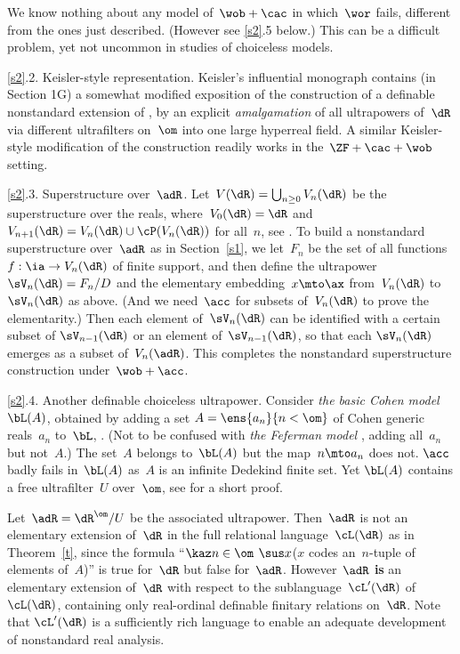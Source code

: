 \documentclass[11pt,
]{article}
\begin{document}
We know nothing about any model of~$\wob+\cac$ in 
which~$\wor$ fails, 
different from the ones just described. 
(However see \ref{s2}.5 below.) 
This can be a difficult problem, yet not uncommon in 
studies of choiceless models.\vom

{\ubf\ref{s2}.2. 
Keisler-style representation.} 
Keisler's influential monograph \cite{Ke76} contains 
(in Section 1G) a somewhat modified exposition of 
the construction of a definable
nonstandard extension of \cite{KS}, by an explicit 
{\it amalgamation\/} of all ultrapowers of~$\dR$ 
via different ultrafilters on~$\om$ into one large 
hyperreal field.  
A similar Keisler-style modification of the construction 
readily works in the~$\ZF+\cac+\wob$ setting.
\vom

{\ubf\ref{s2}.3. 
Superstructure over~$\adR$.}
%
Let~$V(\dR)=\bigcup_{n\geq0}V_n(\dR)$ be the superstructure over the
reals, where~$V_0(\dR)=\dR$
and~$V_{n+1}(\dR)=V_n(\dR)\cup\cP(V_n(\dR))$ for all~$n$, see
\cite[Section]{ck}.  To build a nonstandard superstructure
over~$\adR$ as in Section~\ref{s1}, we let~$F_n$ be the set of all
functions~$f:\ia\to V_n(\dR)$ of finite support, and then define the
ultrapower~$\sV_n(\dR)=F_n/D$ and the elementary embedding~$x\mto\ax$
from~$V_n(\dR)$ to~$\sV_n(\dR)$ as above.  (And we need~$\acc$ for
subsets of~$V_n(\dR)$ to prove the elementarity.)  Then each element
of~$\sV_n(\dR)$ can be identified with a certain subset of
$\sV_{n-1}(\dR)$ or an element of~$\sV_{n-1}(\dR)$, so that each
$\sV_n(\dR)$ emerges as a subset of~$V_{n}(\adR)$.  This completes the
nonstandard superstructure construction under~$\wob+\acc$.\vom

{\ubf\ref{s2}.4.  
Another definable choiceless ultrapower.}
Consider {\em the basic Cohen model\/}~$\bL(A)$, 
obtained by adding a set
$A=\ens{a_n}{n<\om}$ of Cohen generic reals~$a_n$ to~$\bL$,  
\cite[5.3]{jac}. 
(Not to be confused with {\em the Feferman model\/} 
\cite%
{fef}, 
adding all~$a_n$ but not~$A$.) 
The set~$A$ belongs to~$\bL(A)$ but the map~$n\mto a_n$ 
does not. 
%
$\acc$ badly fails in~$\bL(A)$ as~$A$ is an infinite 
Dedekind finite set.
Yet 
$\bL(A)$ contains a free ultrafilter~$U$ over~$\om$,  
see \cite{rep} for a short proof.

Let~$\adR=\dR^\om/U$ be the associated ultrapower.  Then~$\adR$ {\ubf
is not} an elementary extension of~$\dR$ in the full relational
language~$\cL(\dR)$ as in Theorem~\ref{t}, since the formula ``$\kaz
n\in\om\:\,\sus x$($x$ codes an~$n$-tuple of elements of~$A$)'' is true
for~$\dR$ but false for~$\adR$.
%
%
However~$\adR$ {\bf is} an elementary extension of~$\dR$ with respect
to the sublanguage~$\cL'(\dR)$ of~$\cL(\dR)$, containing only
real-ordinal definable finitary relations on~$\dR$.  Note that
$\cL'(\dR)$ is a sufficiently rich language to enable an adequate
development of nonstandard real analysis.
\end{document}
